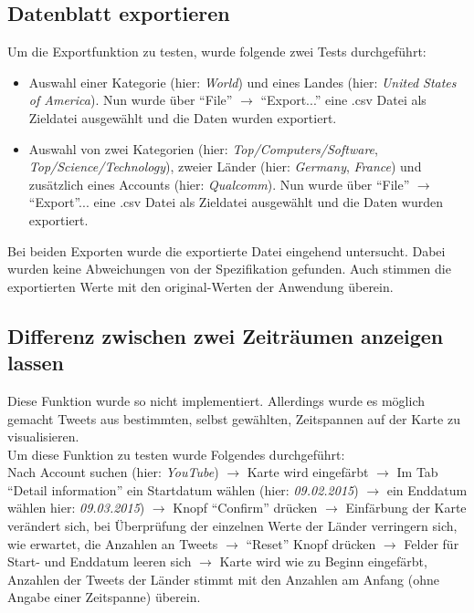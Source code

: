 \subsection{Datenblatt exportieren}
Um die Exportfunktion zu testen, wurde folgende zwei Tests durchgeführt:
\begin{itemize}
	\item Auswahl einer Kategorie (hier: \textit{World}) und eines Landes (hier: \textit{United States of America}). Nun wurde über "`File"' $\to$ "`Export..."' eine .csv Datei als Zieldatei ausgewählt und die Daten wurden exportiert.
	\item Auswahl von zwei Kategorien (hier: \textit{Top/Computers/Software}, \textit{Top/Science/Technology}), zweier Länder (hier: \textit{Germany}, \textit{France}) und zusätzlich eines Accounts (hier: \textit{Qualcomm}). Nun wurde über "`File"' $\to$ "`Export"'... eine .csv Datei als Zieldatei ausgewählt und die Daten wurden exportiert.
\end{itemize}
Bei beiden Exporten wurde die exportierte Datei eingehend untersucht. Dabei wurden keine Abweichungen von der Spezifikation gefunden. Auch stimmen die exportierten Werte mit den original-Werten der Anwendung überein.

\subsection{Differenz zwischen zwei Zeiträumen anzeigen lassen}
Diese Funktion wurde so nicht implementiert. Allerdings wurde es möglich gemacht Tweets aus bestimmten, selbst gewählten, Zeitspannen auf der Karte zu visualisieren.\\
Um diese Funktion zu testen wurde Folgendes durchgeführt:\\ Nach Account suchen (hier: \textit{YouTube}) $\to$ Karte wird eingefärbt $\to$ Im Tab "`Detail information"'  ein Startdatum wählen (hier: \textit{09.02.2015}) $\to$ ein Enddatum wählen hier: \textit{09.03.2015}) $\to$ Knopf "`Confirm"' drücken $\to$ Einfärbung der Karte verändert sich, bei Überprüfung der einzelnen Werte der Länder verringern sich, wie erwartet, die Anzahlen an Tweets $\to$ "`Reset"' Knopf drücken $\to$ Felder für Start- und Enddatum leeren sich $\to$ Karte wird wie zu Beginn eingefärbt, Anzahlen der Tweets der Länder stimmt mit den Anzahlen am Anfang (ohne Angabe einer Zeitspanne) überein.
